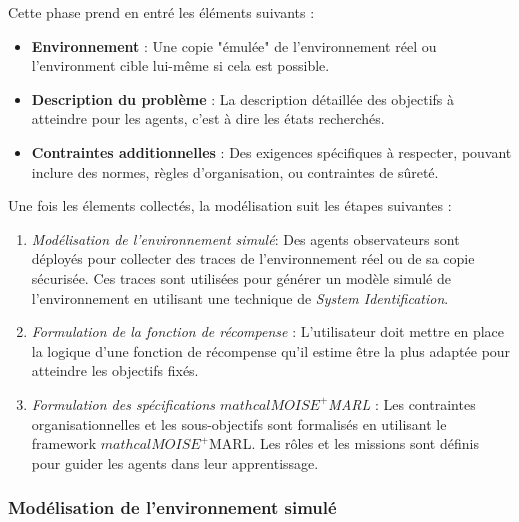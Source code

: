 \documentclass[sigconf,anonymous]{aamas}
\begin{document}
Cette phase prend en entré les éléments suivants :
\begin{itemize}
    \item \textbf{Environnement} : Une copie "émulée" de l'environnement réel ou l'environment cible lui-même si cela est possible.
    \item \textbf{Description du problème} : La description détaillée des objectifs à atteindre pour les agents, c'est à dire les états recherchés.
    \item \textbf{Contraintes additionnelles} : Des exigences spécifiques à respecter, pouvant inclure des normes, règles d'organisation, ou contraintes de sûreté.
\end{itemize}

Une fois les élements collectés, la modélisation suit les étapes suivantes :
\begin{enumerate}
  \item \textit{Modélisation de l'environnement simulé}: Des agents observateurs sont déployés pour collecter des traces de l'environnement réel ou de sa copie sécurisée. Ces traces sont utilisées pour générer un modèle simulé de l'environnement en utilisant une technique de \textit{System Identification}.
  \item \textit{Formulation de la fonction de récompense} : L'utilisateur doit mettre en place la logique d'une fonction de récompense qu'il estime être la plus adaptée pour atteindre les objectifs fixés. 
  \item \textit{Formulation des spécifications $mathcal{M}OISE^+$MARL} : Les contraintes organisationnelles et les sous-objectifs sont formalisés en utilisant le framework $mathcal{M}OISE^+$MARL. Les rôles et les missions sont définis pour guider les agents dans leur apprentissage.
\end{enumerate}

\subsubsection{Modélisation de l'environnement simulé}
\end{document}
